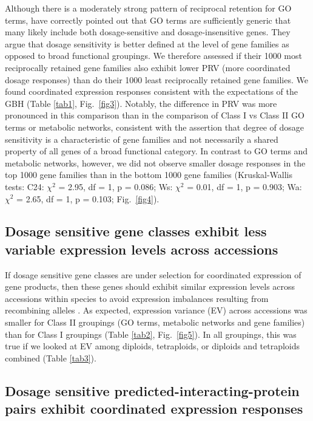\documentclass[11pt]{article}
\begin{document}
Although there is a moderately strong pattern of reciprocal retention for GO terms, \cite{tasdighian2017} have correctly pointed out that GO terms are sufficiently generic that many likely include both dosage-sensitive and dosage-insensitive genes.
They argue that dosage sensitivity is better defined at the level of gene families as opposed to broad functional groupings.
We therefore assessed if their 1000 most reciprocally retained gene families also exhibit lower PRV (more coordinated dosage responses) than do their 1000 least reciprocally retained gene families.
We found coordinated expression responses consistent with the expectations of the GBH (Table \ref{tab1}, Fig.~\ref{fig3}).
Notably, the difference in PRV was more pronounced in this comparison than in the comparison of Class I vs Class II GO terms or metabolic networks, consistent with the \cite{tasdighian2017} assertion that degree of dosage sensitivity is a characteristic of gene families and not necessarily a shared property of all genes of a broad functional category.
	In contrast to GO terms and metabolic networks, however, we did not observe smaller dosage responses in the top 1000 gene families than in the bottom 1000 gene families (Kruskal-Wallis tests: C24: $\chi^2$ = 2.95,  df = 1, p = 0.086; Ws: $\chi^2$ = 0.01,  df = 1, p = 0.903; Wa: $\chi^2$ = 2.65,  df = 1, p = 0.103; Fig.~\ref{fig4}).

\subsection*{Dosage sensitive gene classes exhibit less variable expression levels across accessions}

If dosage sensitive gene classes are under selection for coordinated expression of gene products, then these genes should exhibit similar expression levels across accessions within species to avoid expression imbalances resulting from recombining alleles \citep{coate2016}.
As expected, expression variance (EV) across accessions was smaller for Class II groupings (GO terms, metabolic networks and gene families) than for Class I groupings (Table \ref{tab2}, Fig.~\ref{fig5}).
In all groupings, this was true if we looked at EV among diploids, tetraploids, or diploids and tetraploids combined (Table \ref{tab3}).

\subsection*{Dosage sensitive predicted-interacting-protein pairs exhibit coordinated expression responses}
\end{document}
